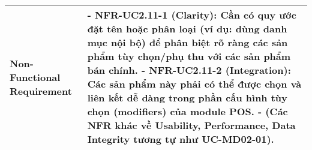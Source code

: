 \begin{longtable}{|m{4cm}|p{11cm}|}
\hline
Non-Functional Requirement & - \textbf{NFR-UC2.11-1 (Clarity):} Cần có quy ước đặt tên hoặc phân loại (ví dụ: dùng danh mục nội bộ) để phân biệt rõ ràng các sản phẩm tùy chọn/phụ thu với các sản phẩm bán chính. \newline - \textbf{NFR-UC2.11-2 (Integration):} Các sản phẩm này phải có thể được chọn và liên kết dễ dàng trong phần cấu hình tùy chọn (modifiers) của module POS. \newline - (Các NFR khác về Usability, Performance, Data Integrity tương tự như UC-MD02-01). \\
\hline

\end{longtable}

